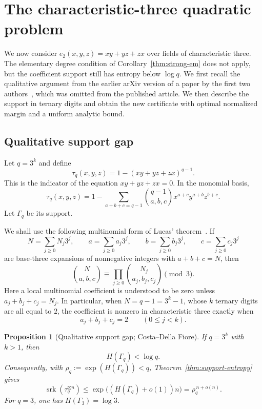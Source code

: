 \documentclass[10pt,a4paper]{amsart}
\newtheorem{proposition}[theorem]{Proposition}
\theoremstyle{definition}
\newcommand{\srk}{\operatorname{srk}}
\newcommand{\boxt}{\boxtimes}
\newcommand{\1}{\mathbf 1}
\begin{document}
\section{The characteristic-three quadratic problem}\label{sec:q3-gap}

We now consider $e_2(x,y,z)=xy+yz+zx$ over fields of characteristic three.  The elementary degree condition of Corollary~\ref{thm:strong-em} does not apply, but the coefficient support still has entropy below $\log q$.  We first recall the qualitative argument from the earlier arXiv version of a paper by the first two authors~\cite[Theorem~4.10 and Remark~4.11]{CostaDellaFiore}, which was omitted from the published article.  We then describe the support in ternary digits and obtain the new certificate with optimal normalized margin and a uniform analytic bound.

\subsection{Qualitative support gap}

Let $q=3^k$ and define
\[
 \tau_q(x,y,z)=1-(xy+yz+zx)^{q-1}.
\]
This is the indicator of the equation $xy+yz+zx=0$.  In the monomial basis,
\[
 \tau_q(x,y,z)
 =1-\sum_{a+b+c=q-1}
 \binom{q-1}{a,b,c}
 x^{a+c}y^{a+b}z^{b+c}.
\]
Let $\Gamma_q$ be its support.

We shall use the following multinomial form of Lucas' theorem~\cite{Lucas1878}.  If
\[
 N=\sum_{j\ge0}N_j3^j,\qquad
 a=\sum_{j\ge0}a_j3^j,\qquad
 b=\sum_{j\ge0}b_j3^j,\qquad
 c=\sum_{j\ge0}c_j3^j
\]
are base-three expansions of nonnegative integers with $a+b+c=N$, then
\[
 \binom{N}{a,b,c}
 \equiv
 \prod_{j\ge0}\binom{N_j}{a_j,b_j,c_j}
 \pmod 3.
\]
Here a local multinomial coefficient is understood to be zero unless
$a_j+b_j+c_j=N_j$.  In particular, when $N=q-1=3^k-1$, whose $k$ ternary digits are all equal to $2$, the coefficient is nonzero in characteristic three exactly when
\[
 a_j+b_j+c_j=2\qquad(0\le j<k).
\]

\begin{proposition}[Qualitative support gap; Costa--Della Fiore]\label{prop:q3-support-gap}
If $q=3^k$ with $k>1$, then
\[
 H(\Gamma_q)<\log q.
\]
Consequently, with $\rho_q:=\exp(H(\Gamma_q))<q$, Theorem~\ref{thm:support-entropy} gives
\[
 \srk(\tau_q^{\boxt n})
 \le \exp\!\bigl((H(\Gamma_q)+o(1))n\bigr)
 =\rho_q^{\,n+o(n)}.
\]
For $q=3$, one has $H(\Gamma_3)=\log3$.
\end{proposition}
\end{document}
